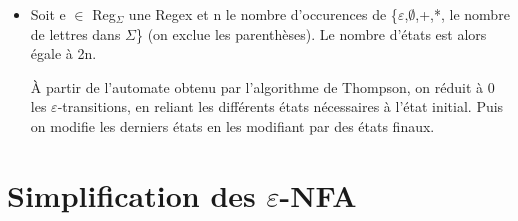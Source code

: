 \documentclass{article}
\begin{document}
\begin{itemize}
    \item Soit e $\in$ Reg$_{\Sigma}$ une Regex et n le nombre d'occurences de \{$\varepsilon$,$\emptyset$,+,*, le nombre de lettres dans $\Sigma$\} (on exclue les parenthèses). Le nombre d'états est alors égale à 2n.

À partir de l'automate obtenu par l'algorithme de Thompson, on réduit à 0 les $\varepsilon$-transitions, en reliant les différents états nécessaires à l'état initial. Puis on modifie les derniers états en les modifiant par des états finaux.
\end{itemize}
\newpage


















\section{Simplification des $\varepsilon$-NFA}
\end{document}
